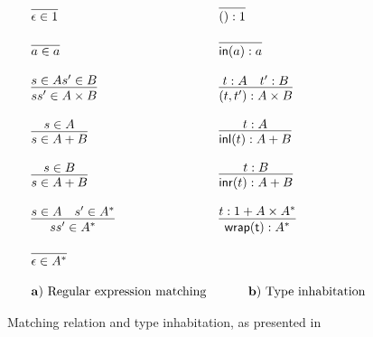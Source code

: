 \begin{figure}
\caption{Matching relation and type inhabitation, as presented in \cite{HN11}}
\label{fig:matchtype}
      \begin{displaymath} 
\begin{array}{ll}
\infer{\match{\epsilon}{1}}{} & \infer{\oft{()}{1}}{} \\\\
\infer{\match{a}{a}}{} &  \infer{\oft{\inj{a}}{a}}{} \\\\
\infer{\match{s s'}{A \times B}}{\match{s}{A} \match{s'}{B}}  &
                                                                \infer{\oft{\pair{t}{t'}}{A
                                                                \times
                                                                B}}{\oft{t}{A}
                       & \oft{t'}{B}}  \\\\   
\infer{\match{s} {A + B}}{\match{s}{A}} &  \infer{\oft{\inl {t}}{A + B}}{\oft{t}{A}} \\\\
\infer{\match{s} {A + B}}{\match{s}{B}} &  \infer{\oft{\inr {t}}{A +
                                          B}}{\oft{t}{B}} \\\\
\infer{\match{s s'}{A^*}}{\match{s}{A} & \match{s'}{A^*}} &
                                                            \infer{\oft{\fold{t}}{A^*}}{\oft{t}{1
                                                            + A \times
                                                            A^*}}\\\\   
\infer{\match{\epsilon}{A^*}}{}         & \\\\
\mathbf{a)}~ \text{Regular expression matching} &  ~~~~~~~
\mathbf{b)}~ \text{Type inhabitation}
\end{array}
    \end{displaymath}
\end{figure} 

